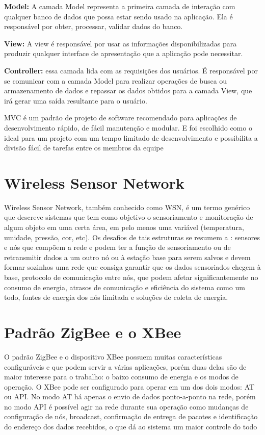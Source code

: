 \textbf{Model:} A camada Model representa a primeira camada de interação com qualquer banco de dados que possa estar sendo usado na aplicação. Ela é responsável por obter, processar, validar dados do banco.

\textbf{View:} A view é responsável por usar as informações disponibilizadas para produzir qualquer interface de apresentação que a aplicação pode necessitar.

\textbf{Controller:} essa camada lida com as requisições dos usuários. É responsável por se comunicar com a camada Model para realizar operações de busca ou armazenamento de dados e repassar os dados obtidos para a camada View, que irá gerar uma saída resultante para o usuário.

MVC é um padrão de projeto de software recomendado para aplicações de desenvolvimento rápido, de fácil manutenção e modular. E foi escolhido como o ideal para um projeto com um tempo limitado de desenvolvimento e possibilita a divisão fácil de tarefas entre os membros da equipe

\section{Wireless Sensor Network }
\label{Sec:WSN}
Wireless Sensor Network, também conhecido como WSN, é um termo genérico que descreve sistemas que tem como objetivo o sensoriamento e monitoração de algum objeto em uma certa área, em pelo menos uma variável (temperatura, umidade, pressão, cor, etc). Os desafios de tais estruturas se resumem a \cite{WSN_survey_JYBMDG_article}: sensores e nós que compõem a rede e podem ter a função de sensoriamento ou de retransmitir dados a um outro nó ou à estação base para serem salvos e devem formar sozinhos uma rede que consiga garantir que os dados sensoriados chegem à base, protocolo de comunicação entre nós, que podem afetar significantemente no consumo de energia, atrasos de comunicação e eficiência do sistema como um todo, fontes de energia dos nós limitada e soluções de coleta de energia. 

\section{Padrão ZigBee e o XBee}
\label{Sec:ZigBee_XBee}
 O padrão ZigBee e o dispositivo XBee possuem muitas características configuráveis e que podem servir a várias aplicações\cite{xbee_book}, porém duas delas são de maior interesse para o trabalho: o baixo consumo de energia e os modos de operação. O XBee pode ser configurado para operar em um dos dois modos: AT ou API. No modo AT há apenas o envio de dados ponto-a-ponto na rede, porém no modo API é possível agir na rede durante sua operação como mudanças de configuração de nós, broadcast, confirmação de entrega de pacotes e identificação do endereço dos dados recebidos, o que dá ao sistema um maior controle do todo \cite{xbee_documentation}
 
